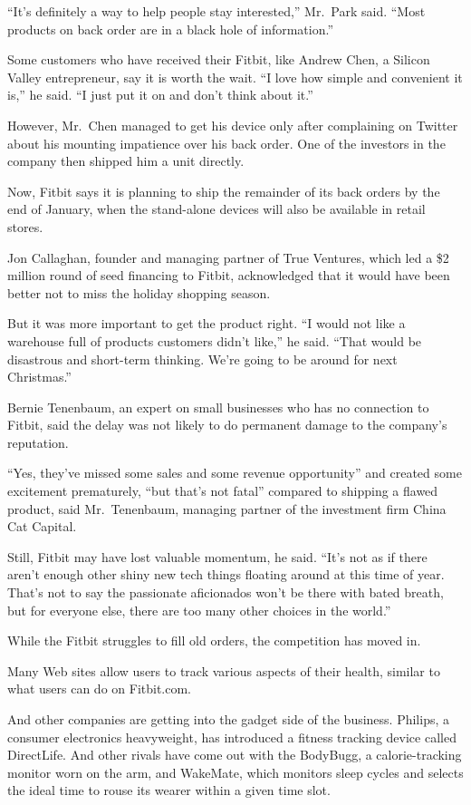 ﻿\documentclass[12pt]{article}
\begin{document}
``It's definitely a way to help people stay interested,'' Mr.~Park said. ``Most products on back
order are in a black hole of information.''

Some customers who have received their Fitbit, like Andrew Chen, a Silicon Valley entrepreneur, say
it is worth the wait. ``I love how simple and convenient it is,'' he said. ``I just put it on and
don't think about it.''

However, Mr.~Chen managed to get his device only after complaining on Twitter about his mounting
impatience over his back order. One of the investors in the company then shipped him a unit
directly.

Now, Fitbit says it is planning to ship the remainder of its back orders by the end of January, when
the stand-alone devices will also be available in retail stores.

Jon Callaghan, founder and managing partner of True Ventures, which led a \$2 million round of seed
financing to Fitbit, acknowledged that it would have been better not to miss the holiday shopping
season.

But it was more important to get the product right. ``I would not like a warehouse full of products
customers didn't like,'' he said. ``That would be disastrous and short-term thinking. We're going to
be around for next Christmas.''

Bernie Tenenbaum, an expert on small businesses who has no connection to Fitbit, said the delay was
not likely to do permanent damage to the company's reputation.

``Yes, they've missed some sales and some revenue opportunity'' and created some excitement
prematurely, ``but that's not fatal'' compared to shipping a flawed product, said Mr.~Tenenbaum,
managing partner of the investment firm China Cat Capital.

Still, Fitbit may have lost valuable momentum, he said. ``It's not as if there aren't enough other
shiny new tech things floating around at this time of year. That's not to say the passionate
aficionados won't be there with bated breath, but for everyone else, there are too many other
choices in the world.''

While the Fitbit struggles to fill old orders, the competition has moved in.

Many Web sites allow users to track various aspects of their health, similar to what users can do on
Fitbit.com.

And other companies are getting into the gadget side of the business. Philips, a consumer
electronics heavyweight, has introduced a fitness tracking device called DirectLife. And other
rivals have come out with the BodyBugg, a calorie-tracking monitor worn on the arm, and WakeMate,
which monitors sleep cycles and selects the ideal time to rouse its wearer within a given time slot.
\end{document}
